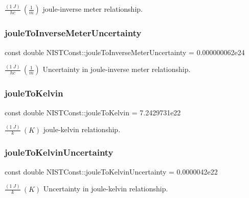 $\frac{(1\ J)}{hc} \ (\frac{1}{m})$ joule-\/inverse meter relationship. \mbox{\label{group___n_i_s_t_const-_joule_gaed9939434cab903ad8dbc9d4da1d5e0c}} 
\subsubsection{\texorpdfstring{joule\+To\+Inverse\+Meter\+Uncertainty}{jouleToInverseMeterUncertainty}}
{\footnotesize\ttfamily const double N\+I\+S\+T\+Const\+::joule\+To\+Inverse\+Meter\+Uncertainty = 0.\+000000062e24}

$\frac{(1\ J)}{hc} \ (\frac{1}{m})$ Uncertainty in joule-\/inverse meter relationship. \mbox{\label{group___n_i_s_t_const-_joule_ga506f23a4b88678bd7ee6f1067e97aa83}} 
\subsubsection{\texorpdfstring{joule\+To\+Kelvin}{jouleToKelvin}}
{\footnotesize\ttfamily const double N\+I\+S\+T\+Const\+::joule\+To\+Kelvin = 7.\+2429731e22}

$\frac{(1\ J)}{k} \ (K)$ joule-\/kelvin relationship. \mbox{\label{group___n_i_s_t_const-_joule_ga32d9bd2dfbaa6786b317c517b17c2f59}} 
\subsubsection{\texorpdfstring{joule\+To\+Kelvin\+Uncertainty}{jouleToKelvinUncertainty}}
{\footnotesize\ttfamily const double N\+I\+S\+T\+Const\+::joule\+To\+Kelvin\+Uncertainty = 0.\+0000042e22}

$\frac{(1\ J)}{k} \ (K)$ Uncertainty in joule-\/kelvin relationship. \mbox{\label{group___n_i_s_t_const-_joule_ga250f161277a6e581e695dccb7c11d1fb}} 
